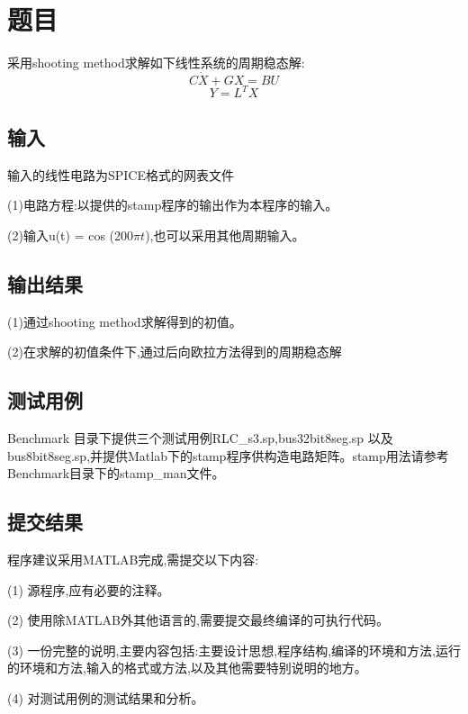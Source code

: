 \documentclass[12pt]{article}
\begin{document}
\begin{sloppypar}
\begin{titlepage}
\begin{center}
\end{center}
\end{titlepage}



\newpage
\begin{spacing}{1.2}
	\tableofcontents
\end{spacing}   %
\thispagestyle{empty}   %
\newpage

\section{题目}
\qquad 采用shooting method求解如下线性系统的周期稳态解:
\begin{equation}
\label{MNA}
C \dot{X}+G X=B U
\end{equation}
\begin{equation}
Y=L^T X 
\end{equation}

\subsection{输入}
\qquad 输入的线性电路为SPICE格式的网表文件 \par
\qquad (1)电路方程:以提供的stamp程序的输出作为本程序的输入。 \par
\qquad (2)输入u(t) = cos (200$\pi t$),也可以采用其他周期输入。 \par

\subsection{输出结果}
\qquad (1)通过shooting method求解得到的初值。 \par
\qquad (2)在求解的初值条件下,通过后向欧拉方法得到的周期稳态解\par

\subsection{测试用例}
\qquad Benchmark 目录下提供三个测试用例RLC\_s3.sp,bus32bit8seg.sp 以及bus8bit8seg.sp,并提供Matlab下的stamp程序供构造电路矩阵。stamp用法请参考Benchmark目录下的stamp\_man文件。\par

\subsection{提交结果}
\qquad 程序建议采用MATLAB完成,需提交以下内容: \par
\qquad (1) 源程序,应有必要的注释。 \par
\qquad (2) 使用除MATLAB外其他语言的,需要提交最终编译的可执行代码。 \par
\qquad (3) 一份完整的说明,主要内容包括:主要设计思想,程序结构,编译的环境和方法,运行的环境和方法,输入的格式或方法,以及其他需要特别说明的地方。 \par
\qquad (4) 对测试用例的测试结果和分析。 \par



\end{sloppypar}
\end{document}
